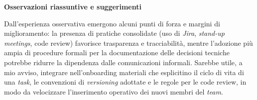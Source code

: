 \medskip
\noindent\textbf{Osservazioni riassuntive e suggerimenti}

Dall’esperienza osservativa emergono alcuni punti di forza e margini di miglioramento: la presenza di pratiche consolidate (uso di \emph{Jira}, \emph{stand-up meetings}, code review) 
favorisce trasparenza e tracciabilità, mentre l’adozione più ampia di procedure formali per la documentazione delle decisioni tecniche potrebbe ridurre la dipendenza dalle comunicazioni informali. 
Sarebbe utile, a mio avviso, integrare nell’onboarding materiali che esplicitino il ciclo di vita di una \emph{task}, le convenzioni di \emph{versioning} adottate e le regole per le code review, 
in modo da velocizzare l’inserimento operativo dei nuovi membri del \emph{team}.


